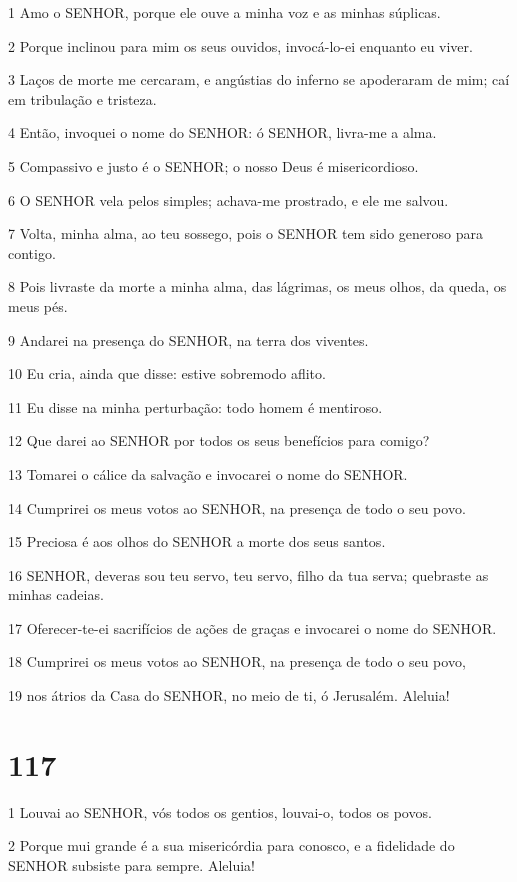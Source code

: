 \par 1 Amo o SENHOR, porque ele ouve a minha voz e as minhas súplicas.
\par 2 Porque inclinou para mim os seus ouvidos, invocá-lo-ei enquanto eu viver.
\par 3 Laços de morte me cercaram, e angústias do inferno se apoderaram de mim; caí em tribulação e tristeza.
\par 4 Então, invoquei o nome do SENHOR: ó SENHOR, livra-me a alma.
\par 5 Compassivo e justo é o SENHOR; o nosso Deus é misericordioso.
\par 6 O SENHOR vela pelos simples; achava-me prostrado, e ele me salvou.
\par 7 Volta, minha alma, ao teu sossego, pois o SENHOR tem sido generoso para contigo.
\par 8 Pois livraste da morte a minha alma, das lágrimas, os meus olhos, da queda, os meus pés.
\par 9 Andarei na presença do SENHOR, na terra dos viventes.
\par 10 Eu cria, ainda que disse: estive sobremodo aflito.
\par 11 Eu disse na minha perturbação: todo homem é mentiroso.
\par 12 Que darei ao SENHOR por todos os seus benefícios para comigo?
\par 13 Tomarei o cálice da salvação e invocarei o nome do SENHOR.
\par 14 Cumprirei os meus votos ao SENHOR, na presença de todo o seu povo.
\par 15 Preciosa é aos olhos do SENHOR a morte dos seus santos.
\par 16 SENHOR, deveras sou teu servo, teu servo, filho da tua serva; quebraste as minhas cadeias.
\par 17 Oferecer-te-ei sacrifícios de ações de graças e invocarei o nome do SENHOR.
\par 18 Cumprirei os meus votos ao SENHOR, na presença de todo o seu povo,
\par 19 nos átrios da Casa do SENHOR, no meio de ti, ó Jerusalém. Aleluia!

\chapter{117}

\par 1 Louvai ao SENHOR, vós todos os gentios, louvai-o, todos os povos.
\par 2 Porque mui grande é a sua misericórdia para conosco, e a fidelidade do SENHOR subsiste para sempre. Aleluia!

